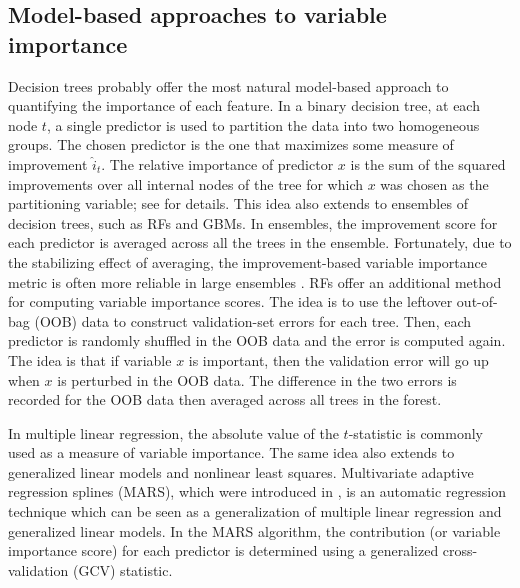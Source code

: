 \documentclass[12pt]{article}
\begin{document}
\subsection{Model-based approaches to variable importance}
\label{sec:model-based-vi}

Decision trees probably offer the most natural model-based approach to quantifying the importance of each feature. In a binary decision tree, at each node $t$, a single predictor is used to partition the data into two homogeneous groups. The chosen predictor is the one that maximizes some measure of improvement $\widehat{i}_t$. The relative importance of predictor $x$ is the sum of the squared improvements over all internal nodes of the tree for which $x$ was chosen as the partitioning variable; see \citet{classification-breiman-1984} for details. This idea also extends to ensembles of decision trees, such as RFs and GBMs. In ensembles, the improvement score for each predictor is averaged across all the trees in the ensemble. Fortunately, due to the stabilizing effect of averaging, the improvement-based variable importance metric is often more reliable in large ensembles \citep[pg. 368]{hastie-elements-2009}. RFs offer an additional method for computing variable importance scores. The idea is to use the leftover out-of-bag (OOB) data to construct validation-set errors for each tree. Then, each predictor is randomly shuffled in the OOB data and the error is computed again. The idea is that if variable $x$ is important, then the validation error will go up when $x$ is perturbed in the OOB data. The difference in the two errors is recorded for the OOB data then averaged across all trees in the forest.

In multiple linear regression, the absolute value of the $t$-statistic is commonly used as a measure of variable importance. The same idea also extends to generalized linear models and nonlinear least squares. Multivariate adaptive regression splines (MARS), which were introduced in \citet{friedman-1991-mars}, is an automatic regression technique which can be seen as a generalization of multiple linear regression and generalized linear models. In the MARS algorithm, the contribution (or variable importance score) for each predictor is determined using a generalized cross-validation (GCV) statistic.
\end{document}
